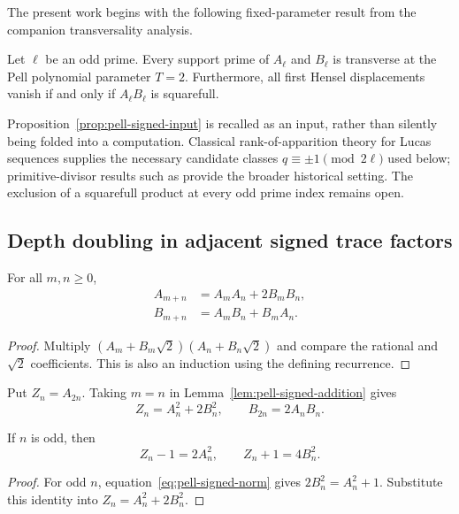 The present work begins with the following fixed-parameter result from the
companion transversality analysis.

\begin{proposition}\label{prop:pell-signed-input}
Let $\ell$ be an odd prime.  Every support prime of $A_\ell$ and
$B_\ell$ is transverse at the Pell polynomial parameter $T=2$.
Furthermore, all first Hensel displacements vanish if and only if
$A_\ell B_\ell$ is squarefull.
\end{proposition}

Proposition~\ref{prop:pell-signed-input} is recalled as an input, rather than silently
being folded into a computation.  Classical rank-of-apparition theory for
Lucas sequences supplies the necessary candidate classes
$q\equiv\pm1\pmod{2\ell}$ used below; primitive-divisor results such as
\cite{BHV2001} provide the broader historical setting.  The exclusion of a
squarefull product at every odd prime index remains open.

\subsection{Depth doubling in adjacent signed trace factors}

\begin{lemma}\label{lem:pell-signed-addition}
For all $m,n\geq0$,
\[
\begin{aligned}
 A_{m+n}&=A_mA_n+2B_mB_n,\\
 B_{m+n}&=A_mB_n+B_mA_n.
\end{aligned}
\]
\end{lemma}

\begin{proof}
Multiply $(A_m+B_m\sqrt2)(A_n+B_n\sqrt2)$ and compare the
rational and $\sqrt2$ coefficients.  This is also an induction using the
defining recurrence.
\end{proof}

Put $Z_n=A_{2n}$.  Taking $m=n$ in
Lemma~\ref{lem:pell-signed-addition} gives
\[
 Z_n=A_n^2+2B_n^2,\qquad B_{2n}=2A_nB_n.
\]

\begin{theorem}\label{thm:pell-signed-trace}
If $n$ is odd, then
\[
 Z_n-1=2A_n^2,\qquad Z_n+1=4B_n^2.
\]
\end{theorem}

\begin{proof}
For odd $n$, equation~\eqref{eq:pell-signed-norm} gives
$2B_n^2=A_n^2+1$.  Substitute this identity into
$Z_n=A_n^2+2B_n^2$.
\end{proof}

